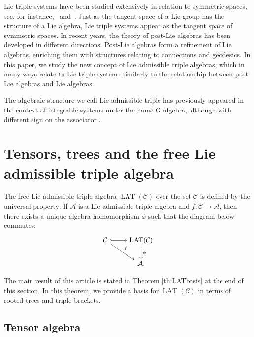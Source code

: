\documentclass[10pt,a4paper]{amsart}
\newcommand*{\LAT}{\operatorname{LAT}}
\numberwithin{equation}{section}
\begin{document}
Lie triple systems have been studied extensively in relation to symmetric spaces, see, for instance,~\cite{Loos1} and~\cite{Bertram_00}. Just as the tangent space of a Lie group has the structure of a Lie algebra, Lie triple systems appear as the tangent space of symmetric spaces. In recent years, the theory of post-Lie algebras has been developed in different directions. Post-Lie algebras form a refinement of Lie algebras, enriching them with structures relating to connections and geodesics. In this paper, we study the new concept of Lie admissible triple algebras, which in many ways relate to Lie triple systems similarly to the relationship between post-Lie algebras and Lie algebras.

\begin{Note}
 The algebraic structure we call Lie admissible triple has previously appeared in the context of integrable systems under the name G-algebra, although with different sign on the associator \cite{GS_00,Sokolov_17}.
\end{Note}

\section{Tensors, trees and the free Lie admissible triple algebra}\label{sec3}

The free Lie admissible triple algebra $\LAT(\mathcal{C})$ over the set $\mathcal{C}$ is defined by the universal property: If $\mathcal{A}$ is a Lie admissible triple algebra and $f \colon \mathcal{C} \rightarrow \mathcal{A}$, then there exists a unique algebra homomorphism $\phi$ such that the diagram below commutes:
\[
\begin{tikzcd}[column sep=small]
\mathcal{C} \arrow[hookrightarrow]{rr} \arrow{rrd}{f}
 && \LAT(\mathcal{C}) \arrow{d}{\phi} \\
 && \mathcal{A}.
\end{tikzcd}
\]

The main result of this article is stated in Theorem \ref{th:LATbasis} at the end of this section. In this theorem, we provide a basis for $\LAT(\mathcal{C})$ in terms of rooted trees and triple-brackets.

\subsection{Tensor algebra}\label{sec:tensor}
\end{document}

